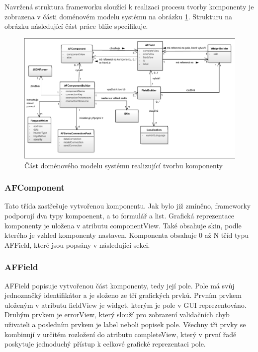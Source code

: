 Navržená struktura frameworku sloužící k realizaci procesu tvorby komponenty je zobrazena v části doménovém modelu systému na obrázku \ref{img:domainModelBuild}. Strukturu na obrázku následující část práce blíže specifikuje.

\begin{figure}[h!]
\includegraphics[width=\textwidth, trim=1 1 1 1, clip]{figures/domainModelBuild}
\caption{Část doménového modelu systému realizující tvorbu komponenty}
\label{img:domainModelBuild}
\end{figure}

\subsubsection{AFComponent}
Tato třída zastřešuje vytvořenou komponentu. Jak bylo již zmíněno, frameworky podporují dva typy kompoenent, a to formulář a list. Grafická reprezentace komponenty je uložena v atributu componentView. Také obsahuje skin, podle kterého je vzhled komponenty nastaven. Komponenta obsahuje 0 až N tříd typu AFField, které jsou popsány v následující sekci.

\subsubsection{AFField}
AFField popisuje vytvořenou část komponenty, tedy její pole. Pole má svůj jednoznačký identifikátor a je složeno ze tří grafických prvků. Prvním prvkem uloženým v atributu fieldView je widget, kterým je pole v GUI reprezentováno. Druhým prvkem je errorView, který slouží pro zobrazení validačních chyb uživateli a posledním prvkem je label neboli popisek pole. Všechny tři prvky se kombinují v určitém rozložení do atributu completeView, který v první řadě poskytuje jednoduchý přístup k celkové grafické reprezentaci pole.

